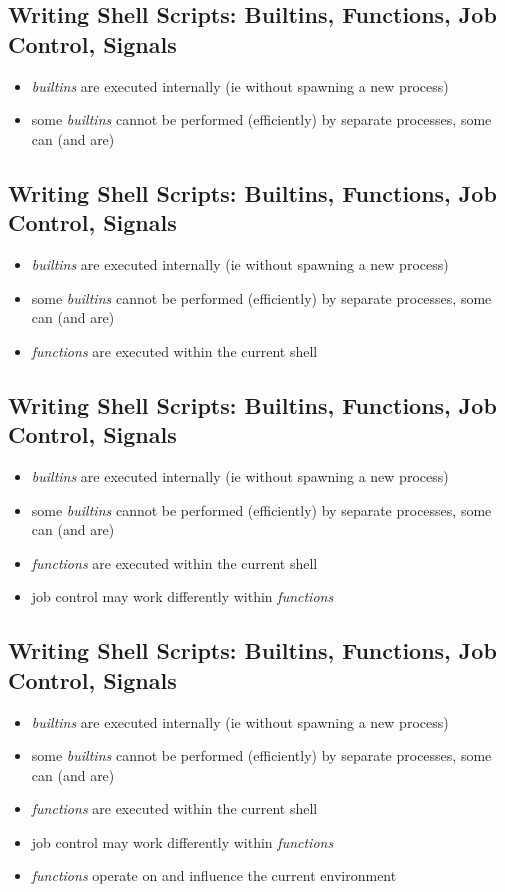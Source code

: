 \documentclass[xga]{xdvislides}
\begin{document}
\subsection{Writing Shell Scripts: Builtins, Functions, Job Control, Signals}
\begin{itemize}
	\item {\em builtins} are executed internally (ie without spawning a
		new process)
	\item some {\em builtins} cannot be performed (efficiently) by
		separate processes, some can (and are)
\end{itemize}

\subsection{Writing Shell Scripts: Builtins, Functions, Job Control, Signals}
\begin{itemize}
	\item {\em builtins} are executed internally (ie without spawning a
		new process)
	\item some {\em builtins} cannot be performed (efficiently) by
		separate processes, some can (and are)
	\item {\em functions} are executed within the current shell
\end{itemize}

\subsection{Writing Shell Scripts: Builtins, Functions, Job Control, Signals}
\begin{itemize}
	\item {\em builtins} are executed internally (ie without spawning a
		new process)
	\item some {\em builtins} cannot be performed (efficiently) by
		separate processes, some can (and are)
	\item {\em functions} are executed within the current shell
	\item job control may work differently within {\em functions}
\end{itemize}

\subsection{Writing Shell Scripts: Builtins, Functions, Job Control, Signals}
\begin{itemize}
	\item {\em builtins} are executed internally (ie without spawning a
		new process)
	\item some {\em builtins} cannot be performed (efficiently) by
		separate processes, some can (and are)
	\item {\em functions} are executed within the current shell
	\item job control may work differently within {\em functions}
	\item {\em functions} operate on and influence the current environment
\end{itemize}
\end{document}
